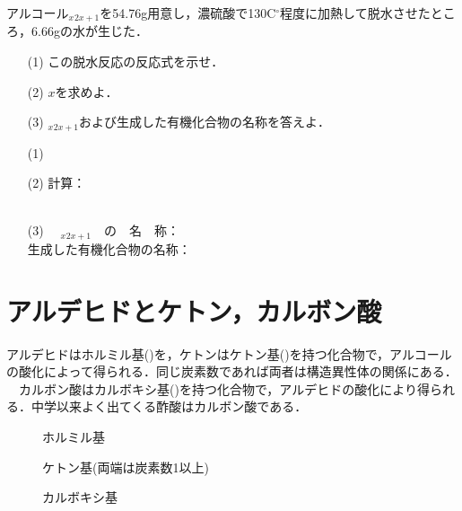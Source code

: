 \documentclass[a4paper,12pt]{ltjsreport}
\begin{document}
        \newpage
        \begin{que}
        アルコール$_{x}$$_{2x+1}$を54.76g用意し，濃硫酸で130C$^\circ$程度に加熱して脱水させたところ，$6.66$gの水が生じた．
      \begin{itemize}
        \item [(1)]この脱水反応の反応式を示せ．
        \item [(2)]$x$を求めよ．
        \item [(3)]$_{x}$$_{2x+1}$および生成した有機化合物の名称を答えよ．
      \end{itemize}
        \end{que}
        \ans
        \begin{itemize}
            \item [(1)]　\\[15pt]
            \item [(2)]計算：\\[100pt]
            \\
            \item [(3)]　$_{x}$$_{2x+1}$　の　名　称：\\[35pt]
        生成した有機化合物の名称：
        \end{itemize}
        \newpage
        \section{アルデヒドとケトン，カルボン酸}
        アルデヒドはホルミル基()を，ケトンはケトン基()を持つ化合物で，{\color{red}アルコールの酸化によって得られる．}同じ炭素数であれば両者は構造異性体の関係にある．\\
　カルボン酸はカルボキシ基()を持つ化合物で，{\color{red}アルデヒドの酸化により得られる．}中学以来よく出てくる酢酸はカルボン酸である．\\
\begin{minipage}{0.25\linewidth}
\begin{figure}[H]
\centering
{}
\caption{ホルミル基}
\end{figure}
\end{minipage}
\begin{minipage}{0.5\linewidth}
\begin{figure}[H]
\centering
{}
\caption{ケトン基(両端は炭素数1以上)}
\end{figure}
\end{minipage}
\begin{minipage}{0.25\linewidth}
\begin{figure}[H]
    \centering
\caption{カルボキシ基} 
\end{figure}
\end{minipage}
\end{document}
